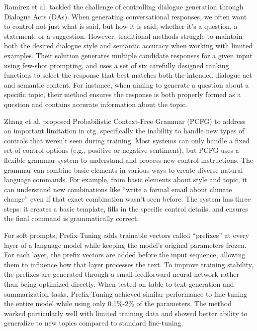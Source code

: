 Ramirez et al. \cite{ramirez-etal-2023-controllable} tackled the challenge of controlling dialogue generation through Dialogue Acts (DAs).
When generating conversational responses, we often want to control not just what is said, but how it is said, whether it's a question, a statement, or a suggestion. 
However, traditional methods struggle to maintain both the desired dialogue style and semantic accuracy when working with limited examples. 
Their solution generates multiple candidate responses for a given input using few-shot prompting, and uses a set of six carefully designed ranking functions to select the response that best matches both the intended dialogue act and semantic content. 
For instance, when aiming to generate a question about a specific topic, their method ensures the response is both properly formed as a question and contains accurate information about the topic.

Zhang et al. \cite{zhang-etal-2023-pcfg} proposed Probabilistic Context-Free Grammar (PCFG) to address an important limitation in \gls{ctg}, specifically the inability to handle new types of controls that weren't seen during training.
Most systems can only handle a fixed set of control options (e.g., positive or negative sentiment), but PCFG uses a flexible grammar system to understand and process new control instructions. 
The grammar can combine basic elements in various ways to create diverse natural language commands. 
For example, from basic elements about style and topic, it can understand new combinations like ``write a formal email about climate change'' even if that exact combination wasn't seen before. 
The system has three steps: it creates a basic template, fills in the specific control details, and ensures the final command is grammatically correct.

For soft prompts, Prefix-Tuning \cite{li-liang-2021-prefix} adds trainable vectors called ``prefixes'' at every layer of a language model while keeping the model's original parameters frozen. 
For each layer, the prefix vectors are added before the input sequence, allowing them to influence how that layer processes the text. 
To improve training stability, the prefixes are generated through a small feedforward neural network rather than being optimized directly. 
When tested on table-to-text generation and summarization tasks, Prefix-Tuning achieved similar performance to fine-tuning the entire model while using only 0.1\%-2\% of the parameters. 
The method worked particularly well with limited training data and showed better ability to generalize to new topics compared to standard fine-tuning.

